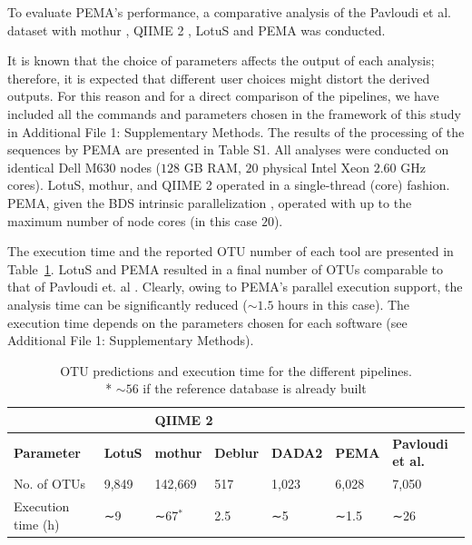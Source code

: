       To evaluate PEMA's performance, a comparative analysis of the Pavloudi et al. \citep{pavloudi2017sediment} dataset with mothur \citep{schloss2009introducing}, QIIME 2 \citep{bolyen2018qiime}, LotuS \citep{hildebrand2014lotus} and PEMA was conducted.

      It is known that the choice of parameters affects the output of each analysis; 
      therefore, it is expected that different user choices might distort the derived outputs. 
      For this reason and for a direct comparison of the pipelines, we have included all the commands and parameters chosen in the framework of this study in Additional File 1: Supplementary Methods. 
      The results of the processing of the sequences by PEMA are presented in Table S1. 
      All analyses were conducted on identical Dell M630 nodes ($128$ GB RAM, $20$ physical Intel Xeon $2.60$ GHz cores). 
      LotuS, mothur, and QIIME 2 operated in a single-thread (core) fashion. 
      PEMA, given the BDS intrinsic parallelization \citep{cingolani2015bigdatascript}, operated with up to the maximum number of node cores (in this case $20$).

      The execution time and the reported OTU number of each tool are presented in Table~\ref{table:pema-compare-times}. 
      LotuS and PEMA resulted in a final number of OTUs comparable to that of Pavloudi et. al \citep{pavloudi2017sediment}. 
      Clearly, owing to PEMA's parallel execution support, the analysis time can be significantly reduced ($∼1.5$ hours in this case). 
      The execution time depends on the parameters chosen for each software (see Additional File 1: Supplementary Methods).

      \begin{table}[]
         \begin{tabular}{@{}lllllll@{}}
         \toprule
         \textbf{} & \textbf{} & \multicolumn{2}{l}{\textbf{QIIME 2}} & \textbf{} & \textbf{} &  \\ \midrule
         \textbf{Parameter} & \textbf{LotuS} & \textbf{mothur} & \textbf{Deblur} & \textbf{DADA2} & \textbf{PEMA} & \textbf{Pavloudi et al. \citep{pavloudi2017sediment}} \\
         No. of OTUs & 9,849 & 142,669 & 517 & 1,023 & 6,028 & 7,050 \\
         Execution time (h) & ∼9 & ∼67$^*$  & 2.5 & ∼5 & ∼1.5 & ∼26 \\ \bottomrule
         \end{tabular}
         \caption[OTU predictions and execution time for the different pipelines]{OTU predictions and execution time for the different pipelines. \\ * $∼56$ if the reference database is already built}
         \label{table:pema-compare-times}
      \end{table}


